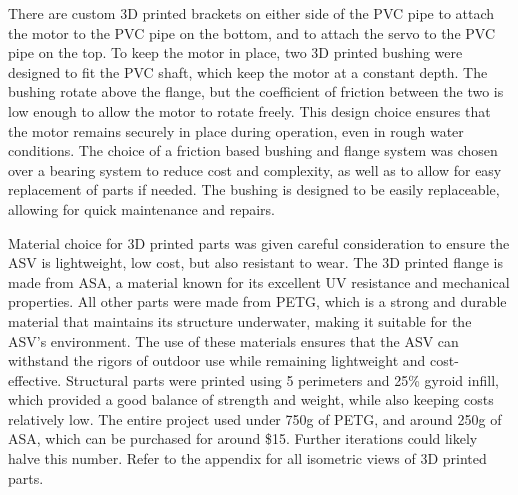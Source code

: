 There are custom 3D printed brackets on either side of the PVC pipe to attach the motor to the PVC pipe on the bottom, and to attach the servo to the PVC pipe on the top. To keep the motor in place, two 3D printed bushing were designed to fit the PVC shaft, which keep the motor at a constant depth. The bushing rotate above the flange, but the coefficient of friction between the two is low enough to allow the motor to rotate freely. This design choice ensures that the motor remains securely in place during operation, even in rough water conditions. The choice of a friction based bushing and flange system was chosen over a bearing system to reduce cost and complexity, as well as to allow for easy replacement of parts if needed. The bushing is designed to be easily replaceable, allowing for quick maintenance and repairs.

Material choice for 3D printed parts was given careful consideration to ensure the ASV is lightweight, low cost, but also resistant to wear. The 3D printed flange is made from ASA, a material known for its excellent UV resistance and mechanical properties. All other parts were made from PETG, which is a strong and durable material that maintains its structure underwater, making it suitable for the ASV's environment. The use of these materials ensures that the ASV can withstand the rigors of outdoor use while remaining lightweight and cost-effective. Structural parts were printed using 5 perimeters and 25\% gyroid infill, which provided a good balance of strength and weight, while also keeping costs relatively low. The entire project used under 750g of PETG, and around 250g of ASA, which can be purchased for around \$15. Further iterations could likely halve this number. Refer to the appendix for all isometric views of 3D printed parts.